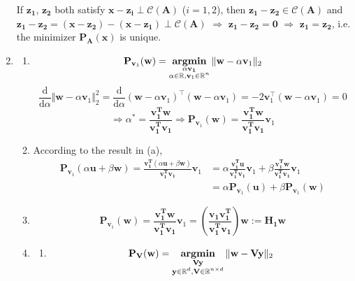 \documentclass[11pt,letter,notitlepage]{article}
\DeclareMathOperator*{\argmin}{\bf argmin}
\newcommand{\proj}[2]{\textbf{P}_{#2} (#1)}
\begin{document}
\begin{solution}
\begin{enumerate}
	If $\mathbf{z_1}$, $\mathbf{z_2}$ both satisfy $\mathbf{x} - \mathbf{z_i} \perp \mathcal{C}(\mathbf{A})$ ($i = 1,2$), then $\mathbf{z_1} - \mathbf{z_2} \in \mathcal{C}(\mathbf{A})$ and $\mathbf{z_1} - \mathbf{z_2} = (\mathbf{x} - \mathbf{z_2}) - (\mathbf{x} - \mathbf{z_1}) \perp \mathcal{C}(\mathbf{A})$ $\Longrightarrow$ $\mathbf{z_1} - \mathbf{z_2} = \mathbf{0}$ $\Longrightarrow$ $\mathbf{z_1} = \mathbf{z_2}$, i.e. the minimizer $\proj{\mathbf{x}}{\mathbf{A}}$ is unique.
	\item 
	\begin{enumerate}
		\item 
		\[
		\proj{\mathbf{w}}{\mathbf{v}_1}
		=
		\argmin_{\substack{\alpha \mathbf{v_1} \\ \alpha \in \mathbb{R}, \mathbf{v}_1 \in \mathbb{R}^n}} \Vert \mathbf{w} - \alpha \mathbf{v}_1 \Vert_2
		\]
		\[
		\frac{\mathrm{d}}{\mathrm{d} \alpha} \Vert \mathbf{w} - \alpha \mathbf{v}_1 \Vert_2^2
		=
		\frac{\mathrm{d}}{\mathrm{d} \alpha} (\mathbf{w} - \alpha \mathbf{v}_1)^{\top}(\mathbf{w} - \alpha \mathbf{v}_1)
		=
		-2\mathbf{v}_1^{\top}(\mathbf{w} - \alpha \mathbf{v}_1)
		=
		0
		\]
		\[
		\Longrightarrow
		\alpha^*
		=
		\frac{\mathbf{v_1^T}\mathbf{w}}{\mathbf{v_1^T}\mathbf{v_1}}
		\Longrightarrow
		\proj{\mathbf{w}}{\mathbf{v}_1}
		=
		\frac{\mathbf{v_1^T}\mathbf{w}}{\mathbf{v_1^T}\mathbf{v_1}}\mathbf{v}_1
		\]
		\item 
		According to the result in (a),
		\begin{align*}
		\proj{\alpha \mathbf{u} + \beta \mathbf{w}}{\mathbf{v}_1}
		=
		\frac{\mathbf{v_1^T}(\alpha \mathbf{u} + \beta \mathbf{w})}{\mathbf{v_1^T}\mathbf{v_1}}\mathbf{v}_1
		&=
		\alpha \frac{\mathbf{v_1^T}\mathbf{u}}{\mathbf{v_1^T}\mathbf{v_1}}\mathbf{v}_1
		+
		\beta \frac{\mathbf{v_1^T}\mathbf{w}}{\mathbf{v_1^T}\mathbf{v_1}}\mathbf{v}_1\\
		&=
		\alpha \proj{\mathbf{u}}{\mathbf{v}_1} + \beta \proj{\mathbf{w}}{\mathbf{v}_1}
		\end{align*}
		\item 
		\[
		\proj{\mathbf{w}}{\mathbf{v}_1}
		=
		\frac{\mathbf{v_1^T}\mathbf{w}}{\mathbf{v_1^T}\mathbf{v_1}}\mathbf{v}_1
		=
		\left(\frac{\mathbf{v_1}\mathbf{v_1^T}}{\mathbf{v_1^T}\mathbf{v_1}}\right)\mathbf{w}
		:=
		\mathbf{H_1} \mathbf{w}
		\]
		\item 
		\begin{enumerate}
			\item 
			\[\proj{\mathbf{w}}{\mathbf{V}}
			=
			\argmin_{\substack{\mathbf{Vy} \\ \mathbf{y} \in \mathbb{R}^d, \mathbf{V} \in \mathbb{R}^{n \times d}}} \Vert \mathbf{w} - \mathbf{Vy} \Vert_2
\]
\end{enumerate}
\end{enumerate}
\end{enumerate}
\end{solution}
\end{document}

